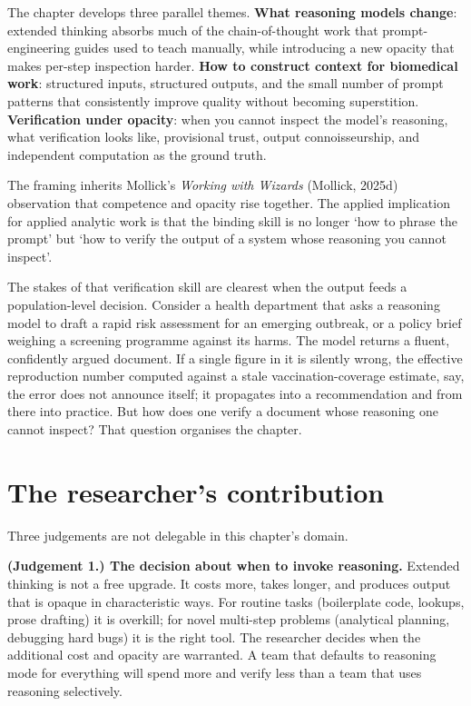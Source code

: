 \documentclass[
  letterpaper,
  11pt]{scrbook}
\begin{document}
The chapter develops three parallel themes. \textbf{What reasoning
models change}: extended thinking absorbs much of the chain-of-thought
work that prompt-engineering guides used to teach manually, while
introducing a new opacity that makes per-step inspection harder.
\textbf{How to construct context for biomedical work}: structured
inputs, structured outputs, and the small number of prompt patterns that
consistently improve quality without becoming superstition.
\textbf{Verification under opacity}: when you cannot inspect the model's
reasoning, what verification looks like, provisional trust, output
connoisseurship, and independent computation as the ground truth.

The framing inherits Mollick's \emph{Working with Wizards} (Mollick,
2025d) observation that competence and opacity rise together. The
applied implication for applied analytic work is that the binding skill
is no longer `how to phrase the prompt' but `how to verify the output of
a system whose reasoning you cannot inspect'.

The stakes of that verification skill are clearest when the output feeds
a population-level decision. Consider a health department that asks a
reasoning model to draft a rapid risk assessment for an emerging
outbreak, or a policy brief weighing a screening programme against its
harms. The model returns a fluent, confidently argued document. If a
single figure in it is silently wrong, the effective reproduction number
computed against a stale vaccination-coverage estimate, say, the error
does not announce itself; it propagates into a recommendation and from
there into practice. But how does one verify a document whose reasoning
one cannot inspect? That question organises the chapter.

\section{The researcher's
contribution}\label{sec-reasoning-context-human}

Three judgements are not delegable in this chapter's domain.

\textbf{(Judgement 1.) The decision about when to invoke reasoning.}
Extended thinking is not a free upgrade. It costs more, takes longer,
and produces output that is opaque in characteristic ways. For routine
tasks (boilerplate code, lookups, prose drafting) it is overkill; for
novel multi-step problems (analytical planning, debugging hard bugs) it
is the right tool. The researcher decides when the additional cost and
opacity are warranted. A team that defaults to reasoning mode for
everything will spend more and verify less than a team that uses
reasoning selectively.
\end{document}
